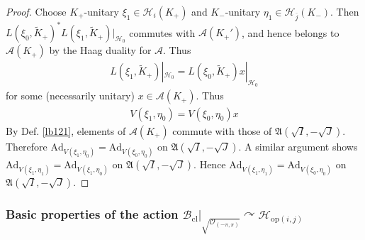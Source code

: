 \documentclass[11pt,b5paper,notitlepage]{article}
\theoremstyle{definition}
\theoremstyle{plain}
\newcommand{\fk}{\mathfrak}
\newcommand{\wtd}{\widetilde}
\newcommand{\ovl}{\overline}
\newcommand{\Ad}{\mathrm{Ad}}
\newcommand{\MA}{\mathcal A}
\newcommand{\MH}{\mathcal H}
\newcommand{\Bcl}{\mathcal B_{\mathrm{cl}}}
\newcommand{\ZOpp}{\sqrt{\mathcal O_{(-\pi,\pi)}}}
\newcommand{\Hopij}{\mathcal H_{\mathrm{op}(i,j)}}
\numberwithin{equation}{section}
\begin{document}
\begin{proof}
Choose $K_+$-unitary $\xi_1\in\MH_i(K_+)$ and $K_-$-unitary $\eta_1\in\MH_{\ovl j}(K_-)$. Then $L(\xi_0,\wtd K_+)^*L(\xi_1,\wtd K_+)|_{\MH_0}$ commutes with $\MA(K_+')$, and hence belongs to $\MA(K_+)$ by the Haag duality for $\MA$. Thus
\begin{align*}
L(\xi_1,\wtd K_+)|_{\MH_0}=L(\xi_0,\wtd K_+)x|_{\MH_0}
\end{align*} 
for some (necessarily unitary) $x\in\MA(K_+)$. Thus
\begin{align*}
V(\xi_1,\eta_0)=V(\xi_0,\eta_0)x
\end{align*}
By Def. \ref{lb121}, elements of $\MA(K_+)$ commute with those of $\fk A(\sqrt I,-\sqrt J)$. Therefore $\Ad_{V(\xi_1,\eta_0)}=\Ad_{V(\xi_0,\eta_0)}$ on $\fk A(\sqrt I,-\sqrt J)$. A similar argument shows $\Ad_{V(\xi_1,\eta_1)}=\Ad_{V(\xi_1,\eta_0)}$ on $\fk A(\sqrt I,-\sqrt J)$. Hence $\Ad_{V(\xi_1,\eta_1)}=\Ad_{V(\xi_0,\eta_0)}$ on $\fk A(\sqrt I,-\sqrt J)$.
\end{proof}






\subsubsection{Basic properties of the action $\Bcl\big|_{\ZOpp}\curvearrowright\Hopij$}
\end{document}
